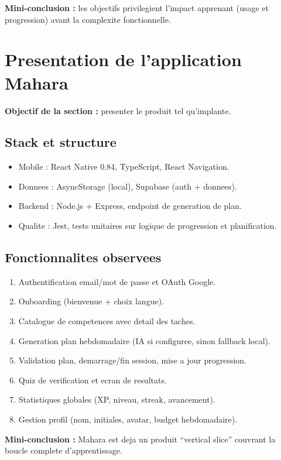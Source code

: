 \documentclass[12pt,a4paper]{article}
\begin{document}
\textbf{Mini-conclusion :} les objectifs privilegient l'impact apprenant (usage et progression) avant la complexite fonctionnelle.

\section{Presentation de l'application Mahara}
\textbf{Objectif de la section :} presenter le produit tel qu'implante.

\subsection{Stack et structure}
\begin{itemize}
  \item Mobile : React Native 0.84, TypeScript, React Navigation.
  \item Donnees : AsyncStorage (local), Supabase (auth + donnees).
  \item Backend : Node.js + Express, endpoint de generation de plan.
  \item Qualite : Jest, tests unitaires sur logique de progression et planification.
\end{itemize}

\subsection{Fonctionnalites observees}
\begin{enumerate}
  \item Authentification email/mot de passe et OAuth Google.
  \item Onboarding (bienvenue + choix langue).
  \item Catalogue de competences avec detail des taches.
  \item Generation plan hebdomadaire (IA si configuree, sinon fallback local).
  \item Validation plan, demarrage/fin session, mise a jour progression.
  \item Quiz de verification et ecran de resultats.
  \item Statistiques globales (XP, niveau, streak, avancement).
  \item Gestion profil (nom, initiales, avatar, budget hebdomadaire).
\end{enumerate}

\textbf{Mini-conclusion :} Mahara est deja un produit ``vertical slice'' couvrant la boucle complete d'apprentissage.
\end{document}

